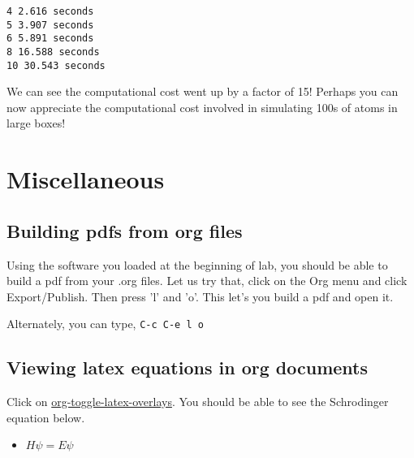 \documentclass[11pt]{article}
\begin{document}
\begin{verbatim}
4 2.616 seconds
5 3.907 seconds
6 5.891 seconds
8 16.588 seconds
10 30.543 seconds
\end{verbatim}

We can see the computational cost went up by a factor of 15! Perhaps you can now appreciate the computational cost involved in simulating 100s of atoms in large boxes!




\section{Miscellaneous}
\label{sec:org2f24280}

\subsection{Building pdfs from org files}
\label{sec:org2ff82d4}

Using the software you loaded at the beginning of lab, you should be able to build a pdf from your .org files. Let us try that, click on the Org menu and click Export/Publish. Then press 'l' and 'o'. This let's you build a pdf and open it.

Alternately, you can type, \texttt{C-c C-e l o}


\subsection{Viewing latex equations in org documents}
\label{sec:org7998caf}

Click on \url{org-toggle-latex-overlays}. You should be able to see the Schrodinger equation below.

\begin{itemize}
\item \(H\psi = E\psi\)
\end{itemize}
\end{document}
